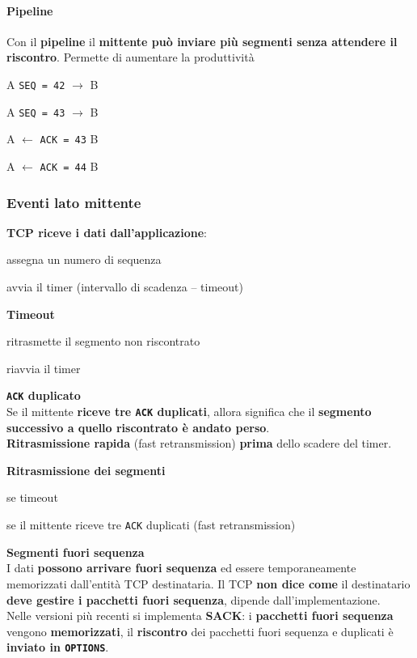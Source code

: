 \documentclass[10pt]{article}
\begin{document}
\paragraph{Pipeline} Con il \textbf{pipeline} il \textbf{mittente può inviare più segmenti senza attendere il riscontro}. Permette di aumentare la produttività
\begin{list}{}{}
\item A \texttt{SEQ = 42} $\longrightarrow$ B
\item A \texttt{SEQ = 43} $\longrightarrow$ B
\item A $\longleftarrow$ \texttt{ACK = 43} B
\item A $\longleftarrow$ \texttt{ACK = 44} B
\end{list}
\subsubsection{Eventi lato mittente}
\begin{list}{}{}
\item \textbf{TCP riceve i dati dall'applicazione}:
	\begin{list}{-}{}
	\item assegna un numero di sequenza
	\item avvia il timer (intervallo di scadenza -- timeout)
	\end{list}
\item \textbf{Timeout}
	\begin{list}{-}{}
	\item ritrasmette il segmento non riscontrato
	\item riavvia il timer
	\end{list}
\item \textbf{\texttt{ACK} duplicato}\\
Se il mittente \textbf{riceve tre \texttt{ACK} duplicati}, allora significa che il \textbf{segmento successivo a quello riscontrato è andato perso}.\\
\textbf{Ritrasmissione rapida} (fast retransmission) \textbf{prima} dello scadere del timer.
\item \textbf{Ritrasmissione dei segmenti}
	\begin{list}{-}{}
	\item se timeout
	\item se il mittente riceve tre \texttt{ACK} duplicati (fast retransmission)
	\end{list}
\item \textbf{Segmenti fuori sequenza}\\
I dati \textbf{possono arrivare fuori sequenza} ed essere temporaneamente memorizzati dall'entità TCP destinataria. Il TCP \textbf{non dice come} il destinatario \textbf{deve gestire i pacchetti fuori sequenza}, dipende dall'implementazione.\\
Nelle versioni più recenti si implementa \textbf{SACK}: i \textbf{pacchetti fuori sequenza} vengono \textbf{memorizzati}, il \textbf{riscontro} dei pacchetti fuori sequenza e duplicati è \textbf{inviato in \texttt{OPTIONS}}.
\end{list}
\end{document}
